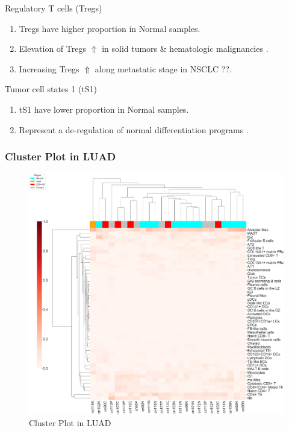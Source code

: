\documentclass{beamer}
\begin{document}
\begin{frame}[allowframebreaks]
        \begin{block}{Regulatory T cells (Tregs)}
            \begin{enumerate}
                \item Tregs have higher proportion in Normal samples.
                \item Elevation of Tregs $\Uparrow$ in solid tumors \& hematologic malignancies \cite{Tregs-1}.
                \item Increasing Tregs $\Uparrow$ along metastatic stage in NSCLC \cite{Tregs-2} ??.
            \end{enumerate}
        \end{block}

        \begin{block}{Tumor cell states 1 (tS1)}
            \begin{enumerate}
                \item tS1 have lower proportion in Normal samples.
                \item Represent a de-regulation of normal differentiation programs \cite{singlecell1}.
            \end{enumerate}
        \end{block}
    \end{frame}

    \begin{frame}
        \frametitle{Cluster Plot in LUAD}

        \begin{figure}
            \includegraphics[height=0.6 \textheight]{figures/BisqueRNA/clustermap/STAR.ADC.GSE131907.cluster.pdf}
            \caption{Cluster Plot in LUAD}
        \end{figure}
    \end{frame}
\end{document}
